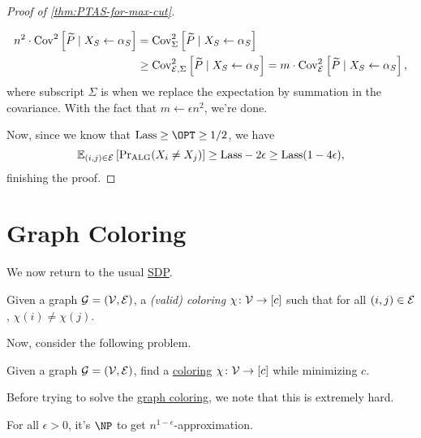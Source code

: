 \begin{proof}[Proof of \autoref{thm:PTAS-for-max-cut}]
\begin{explanation}
\[\begin{split}
				n^2\cdot \mathop{\mathrm{Cov}}\nolimits_{}^2\left[\widetilde{P} \mid X_S \gets \alpha _S \right]
				&= \mathop{\mathrm{Cov}}\nolimits_{\Sigma }^2\left[\widetilde{P} \mid X_S\gets \alpha _S \right] \\
				&\geq \mathop{\mathrm{Cov}}\nolimits_{\mathcal{\MakeUppercase{e}} , \Sigma }^2\left[\widetilde{P} \mid X_S\gets \alpha _S \right]
				= m \cdot \mathop{\mathrm{Cov}}\nolimits_{\mathcal{\MakeUppercase{e}} }^2\left[\widetilde{P} \mid X_S \gets \alpha _S \right],
			\end{split}
		\]
		where subscript \(\Sigma \) is when we replace the expectation by summation in the covariance. With the fact that \(m\gets \epsilon n^2\), we're done.
	\end{explanation}
	Now, since we know that \(\mathrm{Lass} \geq \OPT \geq 1 / 2\), we have
	\[
		\mathbb{E}_{(i, j)\in \mathcal{\MakeUppercase{e}} }\left[ \Pr\nolimits_{\mathrm{ALG}}(X_i \neq X_j) \right]
		\geq \mathrm{Lass} - 2 \epsilon \geq \mathrm{Lass}(1 - 4 \epsilon ),
	\]
	finishing the proof.
\end{proof}

\section{Graph Coloring}
We now return to the usual \hyperref[def:SDP]{SDP}.

\begin{definition}[Coloring]\label{def:coloring}
	Given a graph \(\mathcal{\MakeUppercase{g}} =(\mathcal{\MakeUppercase{v}} , \mathcal{\MakeUppercase{e}} )\), a \emph{(valid) coloring} \(\chi \colon \mathcal{\MakeUppercase{v}} \to [c]\) such that for all \((i, j)\in \mathcal{\MakeUppercase{e}} \), \(\chi (i) \neq \chi (j)\).
\end{definition}

Now, consider the following problem.

\begin{problem}\label{prb:graph-coloring}
Given a graph \(\mathcal{\MakeUppercase{g}} =(\mathcal{\MakeUppercase{v}} , \mathcal{\MakeUppercase{e}} )\), find a \hyperref[def:coloring]{coloring} \(\chi \colon \mathcal{\MakeUppercase{v}} \to [c]\) while minimizing \(c\).
\end{problem}

Before trying to solve the \hyperref[prb:graph-coloring]{graph coloring}, we note that this is extremely hard.

\begin{theorem}
	For all \(\epsilon > 0\), it's \(\NP\) to get \(n^{1 - \epsilon }\)-approximation.
\end{theorem}

